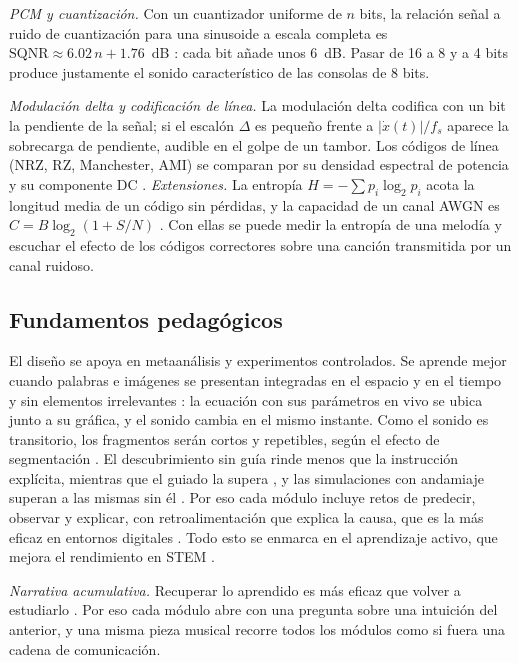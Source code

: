 \documentclass[conference]{IEEEtran}
\begin{document}
\emph{PCM y cuantización.} Con un cuantizador uniforme de $n$ bits, la relación señal a ruido de cuantización para una sinusoide a escala completa es $\mathrm{SQNR}\approx 6.02\,n + 1.76$~dB \citep[prob.~5.16]{hsu2003}: cada bit añade unos 6~dB. Pasar de 16 a 8 y a 4 bits produce justamente el sonido característico de las consolas de 8 bits.

\emph{Modulación delta y codificación de línea.} La modulación delta codifica con un bit la pendiente de la señal; si el escalón $\Delta$ es pequeño frente a $|\dot{x}(t)|/f_s$ aparece la sobrecarga de pendiente, audible en el golpe de un tambor. Los códigos de línea (NRZ, RZ, Manchester, AMI) se comparan por su densidad espectral de potencia y su componente DC \citep[sec.~5.10]{hsu2003}. \emph{Extensiones.} La entropía $H=-\sum p_i\log_2 p_i$ acota la longitud media de un código sin pérdidas, y la capacidad de un canal AWGN es $C=B\log_2(1+S/N)$ \citep{shannon1948}. Con ellas se puede medir la entropía de una melodía y escuchar el efecto de los códigos correctores sobre una canción transmitida por un canal ruidoso.

\subsection{Fundamentos pedagógicos}
El diseño se apoya en metaanálisis y experimentos controlados. Se aprende mejor cuando palabras e imágenes se presentan integradas en el espacio y en el tiempo y sin elementos irrelevantes \citep{mayer2020}: la ecuación con sus parámetros en vivo se ubica junto a su gráfica, y el sonido cambia en el mismo instante. Como el sonido es transitorio, los fragmentos serán cortos y repetibles, según el efecto de segmentación \citep{rey2019}. El descubrimiento sin guía rinde menos que la instrucción explícita, mientras que el guiado la supera \citep{alfieri2011}, y las simulaciones con andamiaje superan a las mismas sin él \citep{dangelo2014}. Por eso cada módulo incluye retos de predecir, observar y explicar, con retroalimentación que explica la causa, que es la más eficaz en entornos digitales \citep{vanderkleij2015}. Todo esto se enmarca en el aprendizaje activo, que mejora el rendimiento en STEM \citep{freeman2014}.

\emph{Narrativa acumulativa.} Recuperar lo aprendido es más eficaz que volver a estudiarlo \citep{adesope2017}. Por eso cada módulo abre con una pregunta sobre una intuición del anterior, y una misma pieza musical recorre todos los módulos como si fuera una cadena de comunicación.
\end{document}
